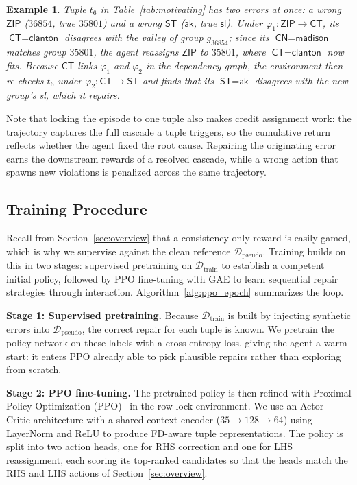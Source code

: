 \documentclass[sigconf]{acmart}
\newtheorem{example}{Example}
\begin{document}
\begin{example}
Tuple $t_6$ in Table~\ref{tab:motivating} has two errors at once: a wrong $\textsf{ZIP}$ ($36854$, true $35801$) and a wrong $\textsf{ST}$ ($\textsf{ak}$, true $\textsf{sl}$). Under $\varphi_1: \textsf{ZIP}\rightarrow\textsf{CT}$, its $\textsf{CT}=\textsf{clanton}$ disagrees with the \textsf{valley} of group $g_{36854}$; since its $\textsf{CN}=\textsf{madison}$ matches group $35801$, the agent reassigns $\textsf{ZIP}$ to $35801$, where $\textsf{CT}=\textsf{clanton}$ now fits. Because $\textsf{CT}$ links $\varphi_1$ and $\varphi_2$ in the dependency graph, the environment then re-checks $t_6$ under $\varphi_2: \textsf{CT}\rightarrow\textsf{ST}$ and finds that its $\textsf{ST}=\textsf{ak}$ disagrees with the new group's \textsf{sl}, which it repairs.
\end{example}

Note that locking the episode to one tuple also makes credit assignment work: the trajectory captures the full cascade a tuple triggers, so the cumulative return reflects whether the agent fixed the root cause. Repairing the originating error earns the downstream rewards of a resolved cascade, while a wrong action that spawns new violations is penalized across the same trajectory.

\subsection{Training Procedure}
\label{sec:training}

Recall from Section~\ref{sec:overview} that a consistency-only reward is easily gamed, which is why we supervise against the clean reference $\mathcal{D}_{\text{pseudo}}$. Training builds on this in two stages: supervised pretraining on $\mathcal{D}_{\text{train}}$ to establish a competent initial policy, followed by PPO fine-tuning with GAE to learn sequential repair strategies through interaction. Algorithm~\ref{alg:ppo_epoch} summarizes the loop.

\noindent\textbf{Stage 1: Supervised pretraining.}
Because $\mathcal{D}_{\text{train}}$ is built by injecting synthetic errors into $\mathcal{D}_{\text{pseudo}}$, the correct repair for each tuple is known. We pretrain the policy network on these labels with a cross-entropy loss, giving the agent a warm start: it enters PPO already able to pick plausible repairs rather than exploring from scratch.

\noindent\textbf{Stage 2: PPO fine-tuning.}
The pretrained policy is then refined with Proximal Policy Optimization (PPO)~\cite{b3} in the row-lock environment. We use an Actor--Critic architecture with a shared context encoder ($35 \rightarrow 128 \rightarrow 64$) using LayerNorm and ReLU to produce FD-aware tuple representations. The policy is split into two action heads, one for RHS correction and one for LHS reassignment, each scoring its top-ranked candidates so that the heads match the RHS and LHS actions of Section~\ref{sec:overview}.
\end{document}
